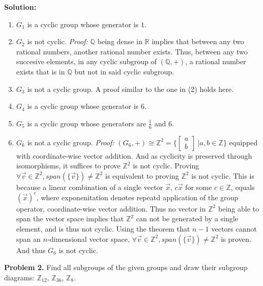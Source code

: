\documentclass[12pt, letterpaper]{article}
\newenvironment{problem}
    [1]
    {\noindent \textbf{Problem #1.}}
    {\vspace{3mm}}
\newenvironment{solution}
    [0]
    {\noindent \textbf{Solution:}} 
    {\vspace{3mm}}
\begin{document}
\begin{solution}
    \begin{enumerate}[(1)]
        \item $G_1$ is a cyclic group whose generator is $1$.
        \item $G_2$ is not cyclic. \emph{Proof:} $\mathbb{Q}$ being dense in $\mathbb{R}$
        implies that between any two rational numbers, another rational number exists.
        Thus, between any two succesive elements, in any cyclic subgroup of $(\mathbb{Q}, +)$,
        a rational number exists that is in $\mathbb{Q}$ but not in said cyclic subgroup. 
        \item $G_3$ is not a cyclic group. A proof similar to the one in (2) holds here.
        \item $G_4$ is a cyclic group whose generator is $6$.
        \item $G_5$ is a cyclic group whose generators are $\frac{1}{6}$ and $6$.
        \item $G_6$ is not a cyclic group. \emph{Proof:} $(G_6, +) \cong \mathbb{Z}^2 = 
        \{\begin{bmatrix} a \\ b \end{bmatrix}\ | a, b \in \mathbb{Z}\}$ equipped with 
        coordinate-wise vector addition. And as cyclicity is preserved through isomorphisms,
        it suffices to prove $\mathbb{Z}^2$ is not cyclic. Proving $\forall \vec{v} \in
        \mathbb{Z}^2, span(\{\vec{v}\}) \neq \mathbb{Z}^2$ is equivalent to proving $\mathbb{Z}^2$
        is not cyclic. This is because a linear combination of a single vector $\vec{x}$, 
        $c\vec{x}$ for some $c \in \mathbb{Z}$, equals $(\vec{x})^c$, where exponenitation 
        denotes repeatd application of the group operator, coordinate-wise vector addition. Thus
        no vector in $\mathbb{Z}^2$ being able to span the vector space implies that $\mathbb{Z}^2$
        can not be generated by a single element, and is thus not cyclic. Using the theorem that
        $n-1$ vectors cannot span an $n$-dimensional vector space, $\forall \vec{v} \in \mathbb{Z}^2, 
        span(\{\vec{v}\}) \neq \mathbb{Z}^2$ is proven. And thus $G_6$ is not cyclic.
    \end{enumerate}
\end{solution}

\begin{problem}{2}
    Find all subgroups of the given groups and draw their subgroup diagrams: 
    $\mathbb{Z}_{12}$, $\mathbb{Z}_{36}$, $\mathbb{Z}_{8}$.
    
\end{problem}
\end{document}
